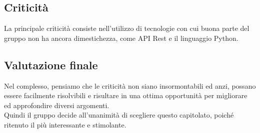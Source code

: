 \subsection{Criticità}
La principale criticità consiste nell'utilizzo di tecnologie con cui buona parte del gruppo non ha ancora dimestichezza, come API Rest e il linguaggio Python.
\subsection{Valutazione finale}
Nel complesso, pensiamo che le criticità non siano insormontabili ed anzi, possano essere facilmente risolvibili e risultare in una ottima opportunità per migliorare ed approfondire diversi argomenti. 
\\Quindi il gruppo decide all'unanimità di scegliere questo capitolato, poiché ritenuto il più interessante e stimolante.